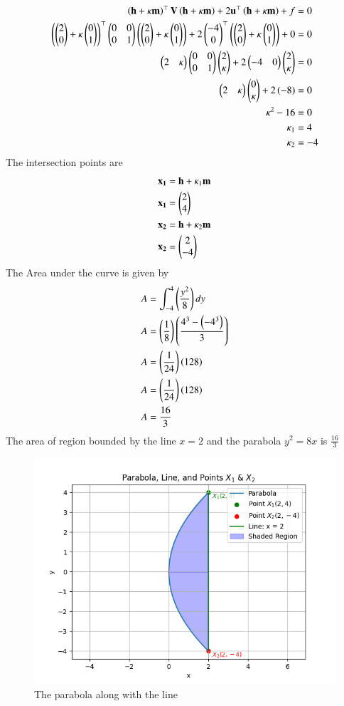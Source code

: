 \documentclass[journal]{IEEEtran}
\begin{document}
\begin{align}
\left(\mathbf{h}+\kappa\mathbf{m}\right)^\top\mathbf{V}\left(\mathbf{h}+\kappa\mathbf{m}\right) + 2\mathbf{u}^\top\left(\mathbf{h}+\kappa\mathbf{m}\right) + f &= 0\\
\left(\begin{pmatrix}2\\0\end{pmatrix}+\kappa\begin{pmatrix}0\\1\end{pmatrix}\right)^\top\begin{pmatrix}0 & 0\\0 & 1\end{pmatrix}\left(\begin{pmatrix}2\\0\end{pmatrix}+\kappa\begin{pmatrix}0\\1\end{pmatrix}\right) + 2\begin{pmatrix}-4\\0\end{pmatrix}^\top\left(\begin{pmatrix}2\\0\end{pmatrix}+\kappa\begin{pmatrix}0\\1\end{pmatrix}\right) + 0 &= 0\\
\begin{pmatrix}2&\kappa\end{pmatrix}\begin{pmatrix}0&0\\0&1\end{pmatrix}\begin{pmatrix}2\\\kappa\end{pmatrix}+2\begin{pmatrix}-4&0\end{pmatrix}\begin{pmatrix}2\\\kappa\end{pmatrix} &= 0\\
\begin{pmatrix}2&\kappa\end{pmatrix}\begin{pmatrix}0\\\kappa\end{pmatrix}+2\left(-8\right) &= 0\\
\kappa^2-16 &= 0\\
\kappa_1&=4\\
\kappa_2&=-4\\
\end{align}
The intersection points are
\begin{align}
\mathbf{x_1} &= \mathbf{h}+\kappa_1\mathbf{m}\\
\mathbf{x_1} &= \begin{pmatrix}2\\4\end{pmatrix}\\
\mathbf{x_2} &= \mathbf{h}+\kappa_2\mathbf{m}\\
\mathbf{x_2} &= \begin{pmatrix}2\\-4\end{pmatrix}
\end{align}
The Area under the curve is given by
\begin{align}
A &= \int_{-4}^{4}\left(\frac{y^2}{8}\right)dy\\
A &= \left(\frac{1}{8}\right)\left(\frac{4^3 - \left(-4^3\right)}{3}\right)\\
A &= \left(\frac{1}{24}\right)\left(128\right)\\
A &= \left(\frac{1}{24}\right)\left(128\right)\\
A &= \frac{16}{3}
\end{align}
The area of region bounded by the line $x=2$ and the parabola $y^2=8x$ is $\frac{16}{3}$
\begin{figure}[h!]
   \centering
   \includegraphics[width = 1\linewidth]{figs/fig.png}
   \caption{The parabola along with the line}
   \label{stemplot}
\end{figure}
\end{document}
